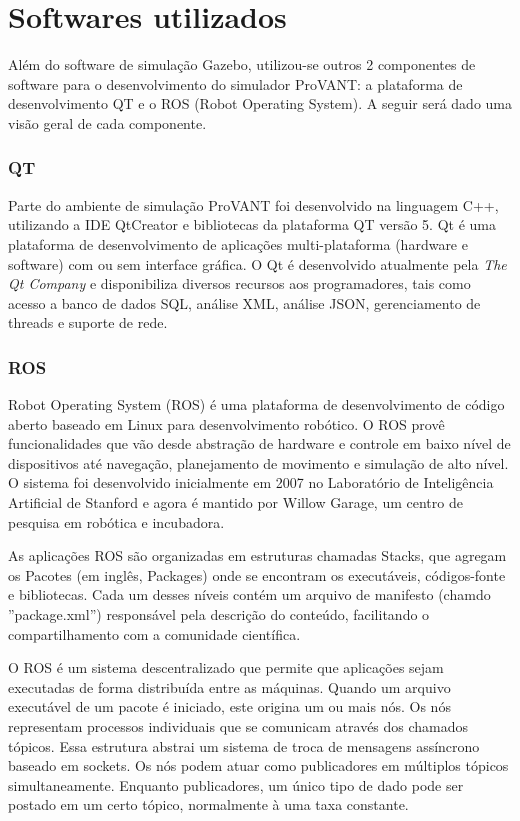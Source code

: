 \section{Softwares utilizados}

Além do software de simulação Gazebo, utilizou-se outros 2 componentes de software para o desenvolvimento do simulador ProVANT: a plataforma de desenvolvimento QT e o ROS (Robot Operating System). A seguir será dado uma visão geral de cada componente.

\subsubsection{QT}

Parte do ambiente de simulação ProVANT foi desenvolvido na linguagem C++, utilizando a IDE QtCreator e bibliotecas da plataforma QT versão 5. Qt é uma plataforma de desenvolvimento de aplicações multi-plataforma (hardware e software) com ou sem interface gráfica. O Qt é desenvolvido atualmente pela \textit{The Qt Company} e disponibiliza diversos recursos aos programadores, tais como acesso a banco de dados SQL, análise XML, análise JSON, gerenciamento de threads e suporte de rede.

\subsubsection{ROS}

Robot Operating System (ROS) é uma plataforma de desenvolvimento de código aberto baseado em Linux para desenvolvimento robótico. O ROS provê funcionalidades que vão desde abstração de hardware e controle em baixo nível de dispositivos até navegação, planejamento de movimento e simulação de alto nível. O sistema foi desenvolvido inicialmente em 2007 no Laboratório de Inteligência Artificial de Stanford e agora é mantido por Willow Garage, um centro de pesquisa em robótica e incubadora.

As aplicações ROS são organizadas em estruturas chamadas Stacks, que agregam os Pacotes (em inglês, Packages) onde se encontram os executáveis, códigos-fonte e bibliotecas. Cada um desses níveis contém um arquivo de manifesto (chamdo ''package.xml'') responsável pela descrição do conteúdo, facilitando o compartilhamento com a comunidade científica. 

O ROS é um sistema descentralizado que permite que aplicações sejam executadas de forma distribuída entre as máquinas. Quando um arquivo executável de um pacote é iniciado, este origina um ou mais nós. Os nós representam processos individuais que se comunicam através dos chamados tópicos. Essa estrutura abstrai um sistema de troca de mensagens assíncrono baseado em sockets. Os nós podem atuar como publicadores em múltiplos tópicos simultaneamente. Enquanto publicadores, um único tipo de dado pode ser postado em um certo tópico, normalmente à uma taxa constante.

